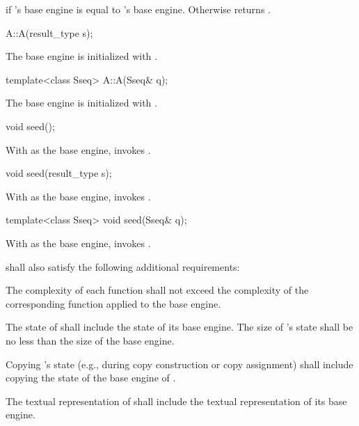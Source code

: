 \begin{itemdescr}
\pnum\returns
  if 's base engine is equal to 's base engine.
 Otherwise returns .
\end{itemdescr}


\begin{itemdecl}
A::A(result_type s);
\end{itemdecl}

\begin{itemdescr}
\pnum\effects
 The base engine is initialized
 with .
\end{itemdescr}


\begin{itemdecl}
template<class Sseq> A::A(Sseq& q);
\end{itemdecl}

\begin{itemdescr}
\pnum\effects
 The base engine is initialized
 with .
\end{itemdescr}

\begin{itemdecl}
void seed();
\end{itemdecl}

\begin{itemdescr}
\pnum\effects
 With  as the base engine, invokes .
\end{itemdescr}

\begin{itemdecl}
void seed(result_type s);
\end{itemdecl}

\begin{itemdescr}
\pnum\effects
 With  as the base engine, invokes .
\end{itemdescr}

\begin{itemdecl}
template<class Sseq> void seed(Sseq& q);
\end{itemdecl}

\begin{itemdescr}
\pnum\effects
 With  as the base engine, invokes .
\end{itemdescr}

\pnum
{} shall also satisfy
the following additional requirements:
\begin{enumeratea}
 \item
   The complexity
   of each function
   shall not exceed the complexity
   of the corresponding function
   applied to the base engine.
 \item
   The state
   of 
   shall include the state
   of its base engine.
   The size of 's state
   shall be no less than the size of the base engine.
 \item
   Copying 's state
   (e.g., during copy construction or copy assignment)
   shall include copying
   the state of the base engine of .
 \item
   The textual representation
   of 
   shall include
   the textual representation of its base engine.
\end{enumeratea}

